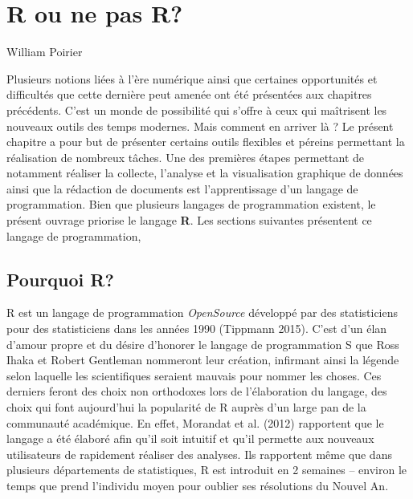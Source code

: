 \documentclass[
  letterpaper,
]{scrbook}
\begin{document}

\hypertarget{r-ou-ne-pas-r}{%
\chapter{R ou ne pas R?}\label{r-ou-ne-pas-r}}

\begin{flushright}
William Poirier
\end{flushright}

Plusieurs notions liées à l'ère numérique ainsi que certaines
opportunités et difficultés que cette dernière peut amenée ont été
présentées aux chapitres précédents. C'est un monde de possibilité qui
s'offre à ceux qui maîtrisent les nouveaux outils des temps modernes.
Mais comment en arriver là ? Le présent chapitre a pour but de présenter
certains outils flexibles et péreins permettant la réalisation de
nombreux tâches. Une des premières étapes permettant de notamment
réaliser la collecte, l'analyse et la visualisation graphique de données
ainsi que la rédaction de documents est l'apprentissage d'un langage de
programmation. Bien que plusieurs langages de programmation existent, le
présent ouvrage priorise le langage \textbf{R}. Les sections suivantes
présentent ce langage de programmation,

\hypertarget{pourquoi-r}{%
\section{Pourquoi R?}\label{pourquoi-r}}

R est un langage de programmation \emph{OpenSource} développé par des
statisticiens pour des statisticiens dans les années 1990 (Tippmann
2015). C'est d'un élan d'amour propre et du désire d'honorer le langage
de programmation S que Ross Ihaka et Robert Gentleman nommeront leur
création, infirmant ainsi la légende selon laquelle les scientifiques
seraient mauvais pour nommer les choses. Ces derniers feront des choix
non orthodoxes lors de l'élaboration du langage, des choix qui font
aujourd'hui la popularité de R auprès d'un large pan de la communauté
académique. En effet, Morandat et al. (2012) rapportent que le langage a
été élaboré afin qu'il soit intuitif et qu'il permette aux nouveaux
utilisateurs de rapidement réaliser des analyses. Ils rapportent même
que dans plusieurs départements de statistiques, R est introduit en 2
semaines -- environ le temps que prend l'individu moyen pour oublier ses
résolutions du Nouvel An.
\end{document}
